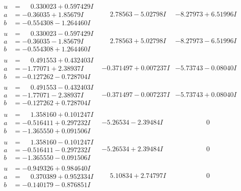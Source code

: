 \documentclass[1p]{elsarticle_modified}
\theoremstyle{definition}
\begin{document}
$$\begin{array}{c|c|c}
\begin{aligned}
u &= \phantom{-}0.330023 + 0.597429 I \\
a &= -0.36035 + 1.85679 I \\
b &= -0.554308 - 1.264460 I\end{aligned}
 & \phantom{-}2.78563 - 5.02798 I & -8.27973 + 6.51996 I \\ \hline\begin{aligned}
u &= \phantom{-}0.330023 - 0.597429 I \\
a &= -0.36035 - 1.85679 I \\
b &= -0.554308 + 1.264460 I\end{aligned}
 & \phantom{-}2.78563 + 5.02798 I & -8.27973 - 6.51996 I \\ \hline\begin{aligned}
u &= \phantom{-}0.491553 + 0.432403 I \\
a &= -1.77071 + 2.38937 I \\
b &= -0.127262 - 0.728704 I\end{aligned}
 & -0.371497 + 0.007237 I & -5.73743 - 0.08040 I \\ \hline\begin{aligned}
u &= \phantom{-}0.491553 - 0.432403 I \\
a &= -1.77071 - 2.38937 I \\
b &= -0.127262 + 0.728704 I\end{aligned}
 & -0.371497 - 0.007237 I & -5.73743 + 0.08040 I \\ \hline\begin{aligned}
u &= \phantom{-}1.358160 + 0.101247 I \\
a &= -0.516411 + 0.297232 I \\
b &= -1.365550 + 0.091506 I\end{aligned}
 & -5.26534 - 2.39484 I & \phantom{-0.000000 } 0 \\ \hline\begin{aligned}
u &= \phantom{-}1.358160 - 0.101247 I \\
a &= -0.516411 - 0.297232 I \\
b &= -1.365550 - 0.091506 I\end{aligned}
 & -5.26534 + 2.39484 I & \phantom{-0.000000 } 0 \\ \hline\begin{aligned}
u &= -0.949326 + 0.984640 I \\
a &= \phantom{-}0.370389 + 0.952334 I \\
b &= -0.140179 - 0.876851 I\end{aligned}
 & \phantom{-}5.10834 + 2.74797 I & \phantom{-0.000000 } 0 \\ \hline\begin{aligned}

\end{aligned}
\end{array}$$
\end{document}
